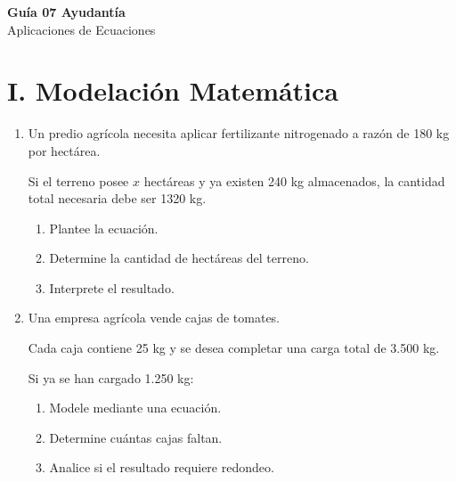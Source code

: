 \documentclass[11pt]{article}
\begin{document}
	
	\vspace*{0.5em}
	
	\begin{center}
		{\Large \textbf{Guía 07 Ayudantía}}\\[0.3em]
		{\small Aplicaciones de Ecuaciones}
	\end{center}
	
	\vspace{0.2cm}
	
	\section*{I. Modelación Matemática}
	
	\begin{enumerate}[label=\textbf{\arabic*.}]
		
		\item Un predio agrícola necesita aplicar fertilizante nitrogenado
		a razón de 180 kg por hectárea.
		
		Si el terreno posee \(x\) hectáreas y ya existen 240 kg almacenados,
		la cantidad total necesaria debe ser 1320 kg.
		
		\begin{enumerate}[label=\alph*)]
			\item Plantee la ecuación.
			\item Determine la cantidad de hectáreas del terreno.
			\item Interprete el resultado.
		\end{enumerate}
		
		
		\item Una empresa agrícola vende cajas de tomates.
		
		Cada caja contiene 25 kg y se desea completar
		una carga total de 3.500 kg.
		
		Si ya se han cargado 1.250 kg:
		
		\begin{enumerate}[label=\alph*)]
			\item Modele mediante una ecuación.
			\item Determine cuántas cajas faltan.
			\item Analice si el resultado requiere redondeo.
		\end{enumerate}
		
	\end{enumerate}
	
\end{document}
